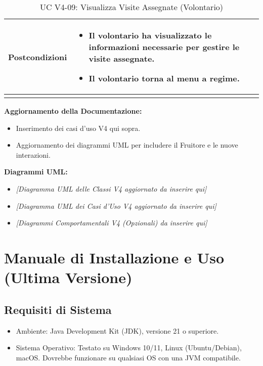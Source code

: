 \documentclass[a4paper,12pt]{article}
\begin{document}
\begin{longtable}{@{} p{} p{} @{}}
\midrule
\textbf{Postcondizioni} &
\begin{itemize}[leftmargin=*]
    \item Il volontario ha visualizzato le informazioni necessarie per gestire le visite assegnate.
    \item Il volontario torna al menu a regime.
\end{itemize} \\
\bottomrule
\caption{UC V4-09: Visualizza Visite Assegnate (Volontario)} \label{uc:v4-09}
\end{longtable}

\bigskip
\textbf{Aggiornamento della Documentazione:}
\begin{itemize}
    \item Inserimento dei casi d’uso V4 qui sopra.
    \item Aggiornamento dei diagrammi UML per includere il Fruitore e le nuove interazioni.
\end{itemize}

\bigskip
\textbf{Diagrammi UML:}
\begin{itemize}
    \item \textit{[Diagramma UML delle Classi V4 aggiornato da inserire qui]}
    \item \textit{[Diagramma UML dei Casi d'Uso V4 aggiornato da inserire qui]}
    \item \textit{[Diagrammi Comportamentali V4 (Opzionali) da inserire qui]}
\end{itemize}

\newpage
\section{Manuale di Installazione e Uso (Ultima Versione)}

\subsection{Requisiti di Sistema}
\begin{itemize}
    \item Ambiente: Java Development Kit (JDK), versione 21 o superiore.
    \item Sistema Operativo: Testato su Windows 10/11, Linux (Ubuntu/Debian), macOS. Dovrebbe funzionare su qualsiasi OS con una JVM compatibile.
\end{itemize}
\end{document}
